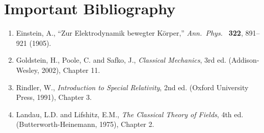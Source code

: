 \section*{Important Bibliography}

\begin{enumerate}
\item Einstein, A., ``Zur Elektrodynamik bewegter K\"{o}rper,'' \textit{Ann.\ Phys.\ } \textbf{322}, 891--921 (1905).
\item Goldstein, H., Poole, C. and Safko, J., \textit{Classical Mechanics}, 3rd ed. (Addison-Wesley, 2002), Chapter 11.
\item Rindler, W., \textit{Introduction to Special Relativity}, 2nd ed. (Oxford University Press, 1991), Chapter 3.
\item Landau, L.D. and Lifshitz, E.M., \textit{The Classical Theory of Fields}, 4th ed. (Butterworth-Heinemann, 1975), Chapter 2.
\end{enumerate}


